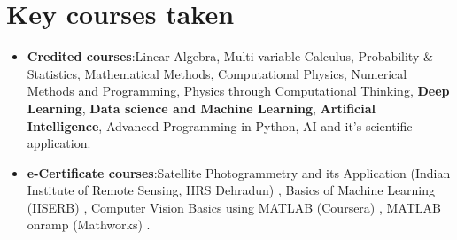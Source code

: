 \documentclass[a4paper,11pt]{article}
\makeatletter
\newcommand{\resumeItem}[2]{
  \item{
    \textbf{#1}{:\hspace{0.5mm}#2 \vspace{-0.5mm}}
  }
}
\newcommand{\resumeProject}[4]{
\vspace{0.4mm}
\item
    \begin{tabular*}{0.98\textwidth}[t]{l@{\extracolsep{\fill}}r}
        \textbf{#1} & \textit{\footnotesize{#3}} \\
        \footnotesize{\textit{#2}} & \footnotesize{#4}
    \end{tabular*}
    \vspace{-2.4mm}
}
\newcommand{\resumeSubItem}[2]{\resumeItem{#1}{#2}\vspace{-4pt}}
\newcommand{\resumeHeadingSkillStart}{\begin{itemize}[leftmargin=*,itemsep=1.7mm, rightmargin=2ex]}
\newcommand{\resumeItemListStart}{\begin{justify}\begin{itemize}[leftmargin=3ex, rightmargin=2ex, noitemsep,labelsep=1.2mm,itemsep=0mm]\small}
\newcommand{\resumeSubHeadingListEnd}{\end{itemize}}
\newcommand{\resumeHeadingSkillEnd}{\end{itemize}\vspace{-2mm}}
\newcommand{\resumeItemListEnd}{\end{itemize}\end{justify}\vspace{-2mm}}
\makeatother
\begin{document}
      



\section{Key courses taken}
\resumeHeadingSkillStart

\resumeSubItem{Credited courses} %
    {Linear Algebra, Multi variable Calculus, Probability \& Statistics, Mathematical Methods, Computational Physics, Numerical Methods and Programming, Physics through Computational Thinking, \textbf{Deep Learning}, \textbf{Data science and Machine Learning}, \textbf{Artificial Intelligence}, Advanced Programming in Python, AI and it's scientific application.}
    
\resumeSubItem{e-Certificate courses} %
    {Satellite Photogrammetry and its Application (Indian Institute of Remote Sensing, IIRS Dehradun) \href{https://drive.google.com/file/d/1Va-hpY1TD7TdQ1_NzGwa9ggJ51vc5G4F/view?usp=share_link}{\footnotesize  \faIcon{external-link-alt}}, Basics of Machine Learning (IISERB) \href{https://drive.google.com/file/d/1BFrfINnnO-heBwsiXnqa4u2_QSWYoIO0/view?usp=share_link}{\footnotesize  \faIcon{external-link-alt}}, Computer Vision Basics using MATLAB (Coursera) \href{https://drive.google.com/file/d/1puteJJLp2zHHtByPVuY3wXHVIiDmp87M/view?usp=sharing}{\footnotesize \faIcon{external-link-alt}}, MATLAB onramp (Mathworks) \href{https://drive.google.com/file/d/1-HQdhUhWTQ7qmyNNIMeb9y5ejI7DH3Uc/view?usp=share_link}{\footnotesize  \faIcon{external-link-alt}}.}
\resumeHeadingSkillEnd
\end{document}
